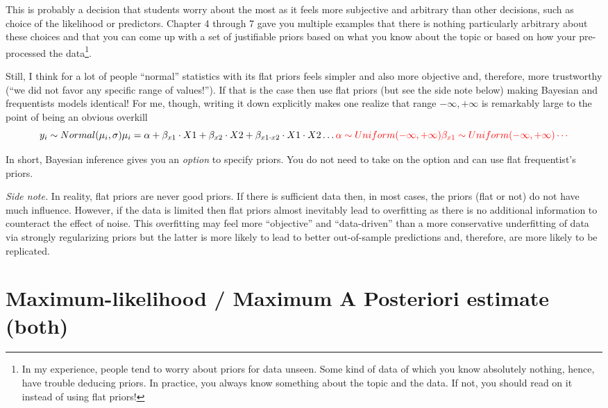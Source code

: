 \documentclass[
]{book}
\begin{document}
This is probably a decision that students worry about the most as it feels more subjective and arbitrary than other decisions, such as choice of the likelihood or predictors. Chapter 4 through 7 gave you multiple examples that there is nothing particularly arbitrary about these choices and that you can come up with a set of justifiable priors based on what you know about the topic or based on how your pre-processed the data\footnote{In my experience, people tend to worry about priors for data unseen. Some kind of data of which you know absolutely nothing, hence, have trouble deducing priors. In practice, you always know something about the topic and the data. If not, you should read on it instead of using flat priors!}.

Still, I think for a lot of people ``normal'' statistics with its flat priors feels simpler and also more objective and, therefore, more trustworthy (``we did not favor any specific range of values!''). If that is the case then use flat priors (but see the side note below) making Bayesian and frequentists models identical! For me, though, writing it down explicitly makes one realize that range \(-\infty, +\infty\) is remarkably large to the point of being an obvious overkill
\[
y_i \sim Normal(\mu_i, \sigma) \\
\mu_i = \alpha + \beta_{x1} \cdot X1 + \beta_{x2} \cdot X2 + \beta_{x1\cdot x2} \cdot X1 \cdot X2 \dotso \\
\color{red}{\alpha \sim Uniform(-\infty, +\infty) \\
\beta_{x1} \sim Uniform(-\infty, +\infty) \\
\cdots}
\]

In short, Bayesian inference gives you an \emph{option} to specify priors. You do not need to take on the option and can use flat frequentist's priors.

\emph{Side note.} In reality, flat priors are never good priors. If there is sufficient data then, in most cases, the priors (flat or not) do not have much influence. However, if the data is limited then flat priors almost inevitably lead to overfitting as there is no additional information to counteract the effect of noise. This overfitting may feel more ``objective'' and ``data-driven'' than a more conservative underfitting of data via strongly regularizing priors but the latter is more likely to lead to better out-of-sample predictions and, therefore, are more likely to be replicated.

\hypertarget{maximum-likelihood-maximum-a-posteriori-estimate-both}{%
\section{Maximum-likelihood / Maximum A Posteriori estimate (both)}\label{maximum-likelihood-maximum-a-posteriori-estimate-both}}
\end{document}
